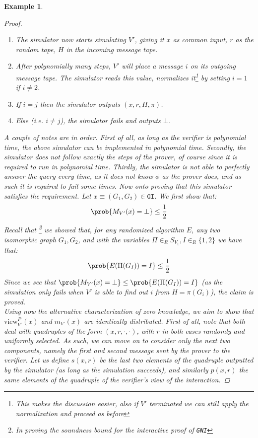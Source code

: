 \documentclass{article}
\newtheorem{example}{Example}
\begin{document}
\begin{example}
\begin{proof}
\begin{enumerate}
            \item The simulator now starts simulating $V'$, giving it $x$ as common input, $r$ as the random tape, $H$ in the incoming message tape.
            \item After polynomially many steps, $V'$ will place a message $i$ on its outgoing message tape. The simulator reads this value, normalizes it\footnote{This makes the discussion easier, also if $V'$ terminated we can still apply the normalization and proceed as before} by setting $i = 1$ if $i \neq 2$. 
            \item If $i = j$ then the simulator outputs $(x, r, H, \pi)$.
            \item Else (i.e. $i \neq j$), the simulator fails and outputs $\bot$.
        \end{enumerate}
        A couple of notes are in order. First of all, as long as the verifier is polynomial time, the above simulator can be implemented in polynomial time. 
        Secondly, the simulator does not follow exactly the steps of the prover, of course since it is required to run in polynomial time. 
        Thirdly, the simulator is not able to perfectly answer the query every time, as it does not know $\phi$ as the prover does, and as such it is required to fail some times. 
        Now onto proving that this simulator satisfies the requirement.
        Let $x \equiv (G_1, G_2) \in \texttt{GI}$.
        We first show that: 
        \[ \prob{M_{V'}(x) = \bot} \leq \frac{1}{2} \]
        Recall that \footnote{In proving the soundness bound for the interactive proof of \texttt{GNI}} we showed that, for any randomized algorithm $E$, any two isomorphic graph $G_1, G_2$, and with the variables $\Pi \in_R S_{V_1}, I \in_R \{1, 2\}$ we have that:
        \[ \prob{E(\Pi(G_I)) = I} \leq \frac{1}{2} \]
        Since we see that $\prob{M_{V'}(x) = \bot} \leq \prob{E(\Pi(G_I)) = I}$ (as the simulation only fails when $V'$ is able to find out $i$ from $H = \pi(G_i)$), the claim is proved. \\
        Using now the alternative characterization of zero knowledge, we aim to show that $\text{view}^{P}_{V'}(x)$ and $m_{V'}(x)$ are identically distributed.
        First of all, note that both deal with quadruples of the form $(x, r, \cdot, \cdot)$, with $r$  in both cases randomly and uniformly selected. As such, we can move on to consider only the next two components, namely the first and second message sent by the prover to the verifier.
        Let us define $s(x,r)$ be the last two elements of the quadruple outputted by the simulator (as long as the simulation succeeds), and similarly $p(x,r)$ the same elements of the quadruple of the verifier's view of the interaction.

\end{proof}
\end{example}
\end{document}
